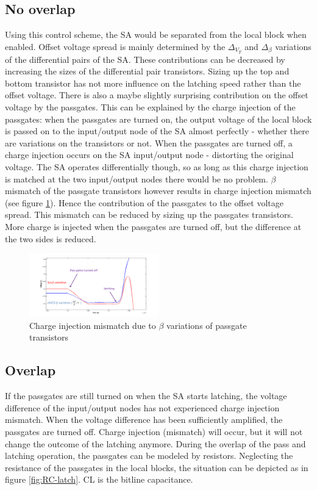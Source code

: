 \documentclass[journal]{IEEEtran}
\begin{document}
\subsection{No overlap}
Using this control scheme, the SA would be separated from the local block when enabled. Offset voltage spread is mainly determined by the $\Delta_{V_{T}}$ and $\Delta_{\beta}$ variations of the differential pairs of the SA. These contributions can be decreased by increasing the sizes of the differential pair transistors. Sizing up the top and bottom transistor has not more influence on the latching speed rather than the offset voltage. There is also a maybe slightly surprising contribution on the offset voltage by the passgates. This can be explained by the charge injection of the passgates: when the passgates are turned on, the output voltage of the local block is passed on to the input/output node of the SA almost perfectly - whether there are variations on the transistors or not. When the passgates are turned off, a charge injection occurs on the SA input/output node - distorting the original voltage. The SA operates differentially though, so as long as this charge injection is matched at the two input/output nodes there would be no problem. $\beta$ mismatch of the passgate transistors however results in charge injection mismatch (see figure \ref{fig:chargeinjection}). Hence the contribution of the passgates to the offset voltage spread. This mismatch can be reduced by sizing up the passgates transistors. More charge is injected when the passgates are turned off, but the difference at the two sides is reduced.

\begin{figure}[ht!]
  \centering
  \includegraphics[width=0.5\textwidth]{../fig/hfdstk-sensamp-chargeinjectionmismatch.png}
  \caption{Charge injection mismatch due to $\beta$ variations of passgate transistors}
  \label{fig:chargeinjection}
\end{figure}

\subsection{Overlap}
If the passgates are still turned on when the SA starts latching, the voltage difference of the input/output nodes has not experienced charge injection mismatch. When the voltage difference has been sufficiently amplified, the passgates are turned off. Charge injection (mismatch) will occur, but it will not change the outcome of the latching anymore. During the overlap of the pass and latching operation, the passgates can be modeled by resistors. Neglecting the resistance of the passgates in the local blocks, the situation can be depicted as in figure \ref{fig:RC-latch}. CL is the bitline capacitance.
\end{document}
